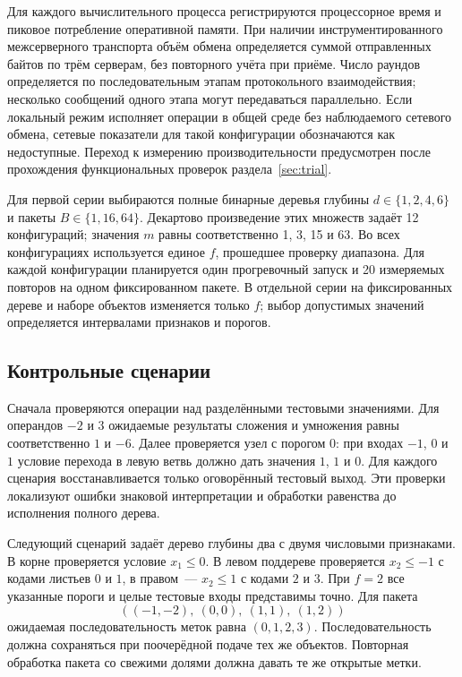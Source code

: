 Для каждого вычислительного процесса регистрируются процессорное время
и пиковое потребление оперативной памяти. При наличии инструментированного
межсерверного транспорта объём обмена определяется суммой отправленных
байтов по трём серверам, без повторного учёта при приёме. Число раундов
определяется по последовательным этапам протокольного взаимодействия;
несколько сообщений одного этапа могут передаваться параллельно.
Если локальный режим исполняет операции в общей среде без наблюдаемого
сетевого обмена, сетевые показатели для такой конфигурации обозначаются
как недоступные. Переход к измерению производительности предусмотрен
после прохождения функциональных проверок раздела~\ref{sec:trial}.


Для первой серии выбираются полные бинарные деревья глубины
$d\in\{1,2,4,6\}$ и пакеты $B\in\{1,16,64\}$. Декартово произведение
этих множеств задаёт 12 конфигураций; значения $m$ равны соответственно
1, 3, 15 и 63. Во всех конфигурациях используется единое $f$,
прошедшее проверку диапазона. Для каждой конфигурации планируется один
прогревочный запуск и 20 измеряемых повторов на одном фиксированном пакете.
В отдельной серии на фиксированных дереве и наборе объектов изменяется
только $f$; выбор допустимых значений определяется интервалами признаков
и порогов.

\subsection{Контрольные сценарии}

Сначала проверяются операции над разделёнными тестовыми значениями.
Для операндов $-2$ и $3$ ожидаемые результаты сложения и умножения равны
соответственно $1$ и $-6$. Далее проверяется узел с порогом $0$:
при входах $-1$, $0$ и $1$ условие перехода в левую ветвь должно дать
значения $1$, $1$ и $0$. Для каждого сценария восстанавливается только
оговорённый тестовый выход. Эти проверки локализуют ошибки знаковой
интерпретации и обработки равенства до исполнения полного дерева.

Следующий сценарий задаёт дерево глубины два с двумя числовыми
признаками. В корне проверяется условие $x_1\leq 0$. В левом поддереве
проверяется $x_2\leq -1$ с кодами листьев $0$ и $1$, в правом~---
$x_2\leq 1$ с кодами $2$ и $3$. При $f=2$ все указанные пороги и целые
тестовые входы представимы точно. Для пакета
\[
  ((-1,-2),\ (0,0),\ (1,1),\ (1,2))
\]
ожидаемая последовательность меток равна $(0,1,2,3)$. Последовательность
должна сохраняться при поочерёдной подаче тех же объектов. Повторная
обработка пакета со свежими долями должна давать те же открытые метки.

